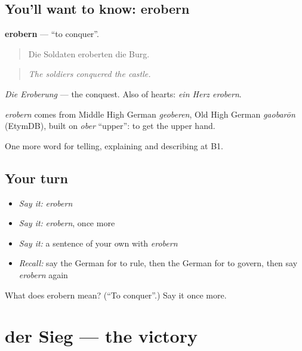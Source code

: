 \subsection*{You'll want to know: erobern}
\textbf{erobern} — \textquotedblleft{}to conquer\textquotedblright{}.

\begin{quote}
Die Soldaten eroberten die Burg.
\end{quote}

\begin{quote}
\emph{The soldiers conquered the castle.}
\end{quote}

\emph{Die Eroberung} — the conquest. Also of hearts: \emph{ein Herz erobern}.

\begin{cousinweb}
\emph{erobern} comes from Middle High German \emph{geoberen}, Old High German \emph{gaobarōn} (EtymDB), built on \emph{ober} \textquotedblleft{}upper\textquotedblright{}: to get the upper hand.
\end{cousinweb}

\begin{grammarlens}[title={What you've built}]
One more word for telling, explaining and describing at B1.
\end{grammarlens}

\subsection*{Your turn}
\begin{itemize}
\raggedright
  \item \emph{Say it:} \emph{erobern}
  \item \emph{Say it:} \emph{erobern}, once more
  \item \emph{Say it:} a sentence of your own with \emph{erobern}
  \item \emph{Recall:} say the German for to rule, then the German for to govern, then say \emph{erobern} again
\end{itemize}

\begin{tcolorbox}[breakable,colback=teal!4,colframe=teal!35!black,title={Before you move on}]
What does erobern mean? (\textquotedblleft{}To conquer\textquotedblright{}.) Say it once more.
\end{tcolorbox}
\section[der Sieg]{der Sieg — the victory}

